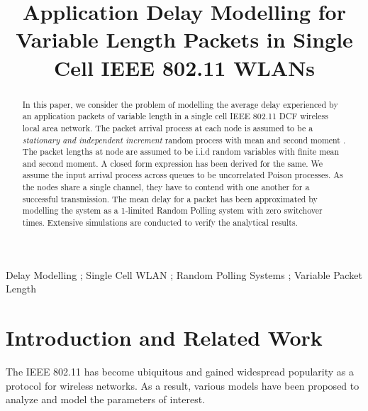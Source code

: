 \documentclass[10pt, conference, compsocconf]{IEEEtran}
\begin{document}
\title{Application Delay Modelling for Variable Length Packets in Single Cell IEEE 802.11 WLANs}


\author{
}



\maketitle


\begin{abstract}
In this paper, we consider the problem of modelling the average delay experienced by an application packets of variable length in a single cell IEEE 802.11 DCF wireless local area network. The packet arrival process at each node  is assumed to be a \emph{stationary and independent increment} random process with mean  and second moment . The packet lengths at node  are assumed to be i.i.d random variables  with finite mean and second moment. A closed form expression has been derived for the same. We assume the input arrival process across queues to be uncorrelated Poison processes. As the nodes share a single channel, they have to contend with one another for a successful transmission. The mean delay for a packet has been approximated by modelling the system as a 1-limited Random Polling system with zero switchover times. Extensive simulations are conducted to verify the analytical results.	
\end{abstract}

\begin{IEEEkeywords}
Delay Modelling ; Single Cell WLAN ; Random Polling Systems ; Variable Packet Length
\end{IEEEkeywords}

\IEEEpeerreviewmaketitle

\section{\large{Introduction and Related Work}}
\label{intro}

The IEEE 802.11 has become ubiquitous and gained widespread popularity as a protocol for wireless networks. As a result, various models have been proposed to analyze and model the parameters of interest.
\end{document}
